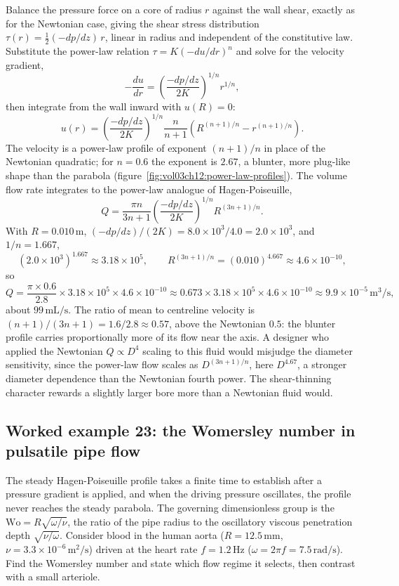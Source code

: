Balance the pressure force on a core of radius $r$ against the wall
shear, exactly as for the Newtonian case, giving the shear stress
distribution $\tau(r) = \tfrac12(-dp/dz)\,r$, linear in radius and
independent of the constitutive law. Substitute the power-law relation
$\tau = K(-du/dr)^n$ and solve for the velocity gradient,
\[
-\frac{du}{dr} = \left(\frac{-dp/dz}{2K}\right)^{1/n} r^{1/n},
\]
then integrate from the wall inward with $u(R) = 0$:
\[
u(r) = \left(\frac{-dp/dz}{2K}\right)^{1/n}\frac{n}{n+1}\left(
R^{(n+1)/n} - r^{(n+1)/n}\right).
\]
The velocity is a power-law profile of exponent $(n+1)/n$ in place of
the Newtonian quadratic; for $n = 0.6$ the exponent is $2.67$, a
blunter, more plug-like shape than the parabola
(figure~\ref{fig:vol03ch12:power-law-profiles}). The volume flow rate
integrates to the power-law analogue of Hagen-Poiseuille,
\[
Q = \frac{\pi n}{3n+1}\left(\frac{-dp/dz}{2K}\right)^{1/n}
R^{(3n+1)/n}.
\]
With $R = 0.010\,\si{\meter}$, $(-dp/dz)/(2K) = 8.0\times10^{3}/4.0 =
2.0\times10^{3}$, and $1/n = 1.667$,
\[
\left(2.0\times10^{3}\right)^{1.667} \approx 3.18\times10^{5}, \qquad
R^{(3n+1)/n} = (0.010)^{4.667} \approx 4.6\times10^{-10},
\]
so
\[
Q = \frac{\pi\times0.6}{2.8}\times3.18\times10^{5}\times4.6\times
10^{-10} \approx 0.673\times3.18\times10^{5}\times4.6\times10^{-10}
\approx 9.9\times10^{-5}\,\si{\meter\cubed\per\second},
\]
about $99\,\text{mL/s}$. The ratio of mean to centreline velocity is
$(n+1)/(3n+1) = 1.6/2.8 \approx 0.57$, above the Newtonian $0.5$: the
blunter profile carries proportionally more of its flow near the axis.
A designer who applied the Newtonian $Q\propto D^4$ scaling to this
fluid would misjudge the diameter sensitivity, since the power-law flow
scales as $D^{(3n+1)/n}$, here $D^{4.67}$, a stronger diameter
dependence than the Newtonian fourth power. The shear-thinning
character rewards a slightly larger bore more than a Newtonian fluid
would.



\subsection*{Worked example 23: the Womersley number in pulsatile pipe flow}

The steady Hagen-Poiseuille profile takes a finite time to establish
after a pressure gradient is applied, and when the driving pressure
oscillates, the profile never reaches the steady parabola. The
governing dimensionless group is the 
$\text{Wo} = R\sqrt{\omega/\nu}$, the ratio of the pipe radius to the
oscillatory viscous penetration depth $\sqrt{\nu/\omega}$. Consider
blood in the human aorta ($R = 12.5\,\si{\milli\meter}$, $\nu = 3.3
\times10^{-6}\,\si{\meter}^2/\si{\second}$) driven at the heart rate
$f = 1.2\,\si{\hertz}$ ($\omega = 2\pi f = 7.5\,\si{\radian\per
\second}$). Find the Womersley number and state which flow regime it
selects, then contrast with a small arteriole.

